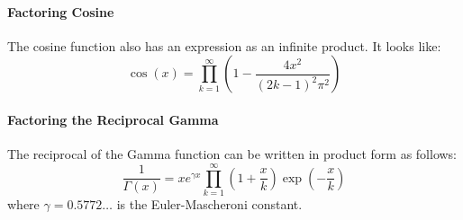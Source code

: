 \paragraph{Factoring Cosine}
The cosine function also has an expression as an infinite product. It looks like:
\begin{equation}
\cos(x) = \prod_{k=1}^{\infty} \left( 1 - \frac{4 x^2}{(2k - 1)^2 \pi^2}  \right)
\end{equation}

\paragraph{Factoring the Reciprocal Gamma}
The reciprocal of the Gamma function can be written in product form as follows:
\begin{equation}
\frac{1}{\Gamma(x)} = x e^{\gamma x} \prod_{k=1}^{\infty} 
\left( 1 + \frac{x}{k}  \right) \exp \left(- \frac{x}{k} \right)
\end{equation}
where $\gamma = 0.5772\ldots$ is the Euler-Mascheroni constant.


%
%
%
%



